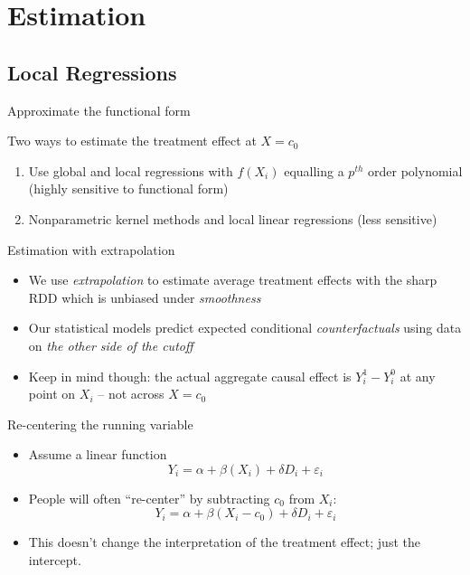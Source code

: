 \documentclass{beamer}
\begin{document}
\section{Estimation}

\subsection{Local Regressions}

\begin{frame}{Approximate the functional form}

Two ways to estimate the treatment effect at $X=c_0$

\bigskip

		\begin{enumerate}
		\item Use global and local regressions with $f(X_i)$ equalling a $p^{th}$ order polynomial (highly sensitive to functional form)
		\item Nonparametric kernel methods and local linear regressions (less sensitive)
		\end{enumerate}
\end{frame}


\begin{frame}{Estimation with extrapolation}
	
	\begin{itemize}
	\item We use \emph{extrapolation} to estimate average treatment effects with the sharp RDD which is unbiased under \emph{smoothness}
	\item Our statistical models predict expected conditional \emph{counterfactuals} using data on \emph{the other side of the cutoff}
	\item Keep in mind though: the actual aggregate causal effect is $Y^1_i - Y^0_i$ at any point on $X_i$ -- not across $X=c_0$
	
	\end{itemize}

\end{frame}


\begin{frame}{Re-centering the running variable}
	
	\begin{itemize}
	\item Assume a linear function $$Y_i = \alpha + \beta(X_i) + \delta D_i + \varepsilon_i$$
	\item People will often ``re-center'' by subtracting $c_0$ from $X_i$:$$Y_i=\alpha + \beta(X_i-c_0) + \delta D_i +\varepsilon_i$$
	\item This doesn't change the interpretation of the treatment effect; just the intercept.
	\end{itemize}

\end{frame}
\end{document}
